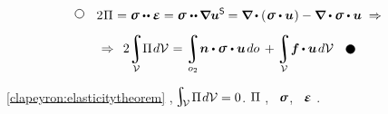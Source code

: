 \vspace{-0.55em}\begin{multline*}
\tikz[baseline=-1ex] \draw [line width=.5pt, color=black, fill=white] (0, 0) circle (.8ex);
\hspace{2.25ex}
2 \hspace{.1ex} \potentialenergydensity \hspace{.1ex} = \linearstress \dotdotp \infinitesimaldeformation =
\linearstress \hspace{.1ex} \dotdotp \hspace{-0.12ex} \boldnabla \bm{u}^{\mathsf{S}} \hspace{-0.12ex} =
\boldnabla \hspace{-0.1ex} \dotp \left( \hspace{.1ex} \linearstress \dotp \bm{u} \hspace{.1ex} \right) -
\tikzmark{beginMinusLoad} \boldnabla \dotp \linearstress \tikzmark{endMinusLoad} \dotp \bm{u} \;\Rightarrow
\\[.5em]
%
\Rightarrow\;\,
\displaystyle 2 \hspace{-0.16em}
\integral\displaylimits_{\mathcal{V}} \hspace{-0.5ex}
  \potentialenergydensity \hspace{.2ex} d\mathcal{V} \hspace{.12ex}
= \integral\displaylimits_{o_2} \hspace{-0.4ex}
\tikzmark{beginSurfaceLoad}
  \unitnormalvector \dotp \linearstress
\tikzmark{endSurfaceLoad} \hspace{.1ex}
  \dotp \bm{u} \hspace{.25ex} do \hspace{.4ex}
+ \integral\displaylimits_{\mathcal{V}} \hspace{-0.4ex}
  \bm{f} \hspace{-0.1ex} \dotp \bm{u} \hspace{.25ex}
  d\mathcal{V} \hspace{2.25ex}
\tikz[baseline=-0.6ex] \draw [color=black, fill=black] (0, 0) circle (.8ex);
\end{multline*}%
%

\vspace{-0.2em}
~\eqref{clapeyron:elasticitytheorem}
,
${\hspace{-0.25ex}
\scalebox{1.4}{$ \integral $}_
{ \hspace{-0.5ex}
   \raisemath{.1em}{\mathcal{V}}
} \hspace{.25ex}
\potentialenergydensity \hspace{.2ex} d\mathcal{V}
= 0
}$.
 $\Pi$
,
~$\linearstress$,
~$\infinitesimaldeformation$
.

